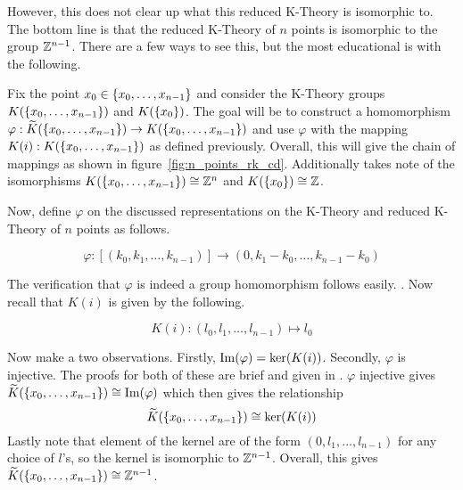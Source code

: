 \documentclass[../sean_thesis.tex]{subfiles}
\begin{document}
\begin{example}
However, this does not clear up what this reduced K-Theory is isomorphic to. The bottom line is that the reduced K-Theory of $n$ points is isomorphic to the group $\mathbb{Z}^{n-1}$. There are a few ways to see this, but the most educational is with the following.

Fix the point $x_0 \in \left\{x_0, \dots, x_{n-1}\right\}$ and consider the K-Theory groups $K(\left\{x_0, \dots, x_{n-1}\right\})$ and $K(\left\{x_0\right\})$. The goal will be to construct a homomorphism $\varphi: \widetilde{K}(\left\{x_0, \dots, x_{n-1}\right\}) \to K(\left\{x_0, \dots, x_{n-1}\right\})$ and use $\varphi$ with the mapping $K(i): K(\left\{x_0, \dots, x_{n-1}\right\})$ as defined previously. Overall, this will give the chain of mappings as shown in figure~\ref{fig:n_points_rk_cd}. Additionally takes note of the isomorphisms $K(\left\{x_0, \dots, x_{n-1}\right\}) \cong \mathbb{Z}^n$ and $K(\left\{x_0\right\}) \cong \mathbb{Z}$.

Now, define $\varphi$ on the discussed representations on the K-Theory and reduced K-Theory of $n$ points as follows.

\begin{equation*}
	\varphi: [(k_0, k_1, \dots, k_{n-1})] \to (0, k_1-k_0, \dots, k_{n-1}-k_0)
\end{equation*}

The verification that $\varphi$ is indeed a group homomorphism follows easily. . Now recall that $K(i)$ is given by the following.

\begin{equation*}
	K(i): (l_0, l_1, \dots, l_{n-1}) \mapsto l_0
\end{equation*}

Now make a two observations. Firstly, $\operatorname{Im}(\varphi) = \ker(K(i))$. Secondly, $\varphi$ is injective. The proofs for both of these are brief and given in . $\varphi$ injective gives $\widetilde{K}(\left\{x_0, \dots, x_{n-1}\right\}) \cong \operatorname{Im}(\varphi)$ which then gives the relationship
\begin{equation*}
	\widetilde{K}(\left\{x_0, \dots, x_{n-1}\right\}) \cong \ker(K(i))
\end{equation*}
Lastly note that element of the kernel are of the form $(0,l_1, \dots, l_{n-1})$ for any choice of $l$'s, so the kernel is isomorphic to $\mathbb{Z}^{n-1}$. Overall, this gives
$\widetilde{K}(\left\{x_0, \dots, x_{n-1}\right\}) \cong \mathbb{Z}^{n-1}$.

%
%

\end{example}
\end{document}
